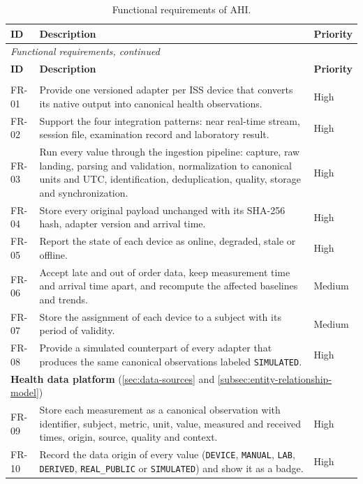 {\footnotesize
\begin{longtable}{p{1.5cm}p{10.8cm}p{1.5cm}}
\caption{Functional requirements of AHI.}
\label{tab:req-functional}\\
\hline
\textbf{ID} & \textbf{Description} & \textbf{Priority} \\
\hline
\endfirsthead
\multicolumn{3}{l}{\textit{Functional requirements, continued}} \\
\hline
\textbf{ID} & \textbf{Description} & \textbf{Priority} \\
\hline
\endhead
\hline
\endfoot
\hline
\endlastfoot
\multicolumn{3}{l}{\textbf{Device integration} (\ref{sec:hardware-sensors})} \\
FR-01 & Provide one versioned adapter per ISS device that converts its native output into canonical health observations. & High \\
FR-02 & Support the four integration patterns: near real-time stream, session file, examination record and laboratory result. & High \\
FR-03 & Run every value through the ingestion pipeline: capture, raw landing, parsing and validation, normalization to canonical units and UTC, identification, deduplication, quality, storage and synchronization. & High \\
FR-04 & Store every original payload unchanged with its SHA-256 hash, adapter version and arrival time. & High \\
FR-05 & Report the state of each device as online, degraded, stale or offline. & High \\
FR-06 & Accept late and out of order data, keep measurement time and arrival time apart, and recompute the affected baselines and trends. & Medium \\
FR-07 & Store the assignment of each device to a subject with its period of validity. & Medium \\
FR-08 & Provide a simulated counterpart of every adapter that produces the same canonical observations labeled \texttt{SIMULATED}. & High \\
\multicolumn{3}{l}{\textbf{Health data platform} (\ref{sec:data-sources} and \ref{subsec:entity-relationship-model})} \\
FR-09 & Store each measurement as a canonical observation with identifier, subject, metric, unit, value, measured and received times, origin, source, quality and context. & High \\
FR-10 & Record the data origin of every value (\texttt{DEVICE}, \texttt{MANUAL}, \texttt{LAB}, \texttt{DERIVED}, \texttt{REAL\_PUBLIC} or \texttt{SIMULATED}) and show it as a badge. & High \\

\end{longtable}}
